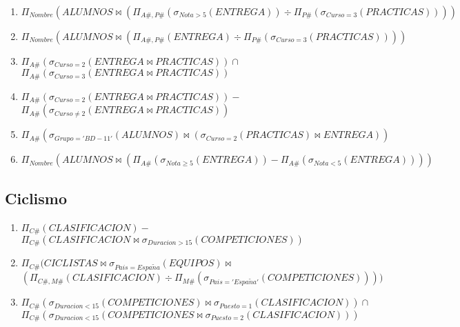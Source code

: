 \documentclass{db-practice}
\begin{document}
\begin{enumerate}
    \item $\Pi_{Nombre} \left( ALUMNOS \bowtie \left( \Pi_{A\#,P\#} \left( \sigma_{Nota>5} \left( ENTREGA \right) \right) \div \Pi_{P\#} \left( \sigma_{Curso=3} \left( PRACTICAS \right) \right) \right) \right)$
    \item $\Pi_{Nombre} \left( ALUMNOS \bowtie \left( \Pi_{A\#,P\#} \left( ENTREGA \right) \div \Pi_{P\#} \left( \sigma_{Curso=3} \left( PRACTICAS \right) \right)\right) \right)$
    \item $\Pi_{A\#} \left( \sigma_{Curso=2} \left( ENTREGA \bowtie PRACTICAS \right) \right) \cap$ \\
          $ \Pi_{A\#} \left( \sigma_{Curso=3} \left( ENTREGA \bowtie PRACTICAS \right) \right)$
    \item $\Pi_{A\#} \left( \sigma_{Curso=2} \left( ENTREGA \bowtie PRACTICAS \right) \right) -$ \\
          $\Pi_{A\#} \left( \sigma_{Curso \neq 2} \left( ENTREGA \bowtie PRACTICAS \right) \right)$
    \item $\Pi_{A\#} \left( \sigma_{Grupo='BD-11'} \left( ALUMNOS \right) \bowtie \left( \sigma_{Curso=2} \left( PRACTICAS \right) \bowtie ENTREGA \right) \right)$
    \item $\Pi_{Nombre} \left( ALUMNOS \bowtie \left( \Pi_{A\#} \left( \sigma_{Nota \geq 5} \left( ENTREGA \right) \right) - \Pi_{A\#} \left( \sigma_{Nota<5} \left( ENTREGA \right) \right) \right) \right)$
\end{enumerate}

\subsection{Ciclismo}

\begin{enumerate}
    \item $\Pi_{C\#} \left( CLASIFICACION \right) -$ \\
          $\Pi_{C\#} \left( CLASIFICACION \bowtie \sigma_{Duracion>15} \left( COMPETICIONES \right) \right)$
    \item $\Pi_{C\#} (CICLISTAS \bowtie \sigma_{Pais=Espa\tilde{n}a} (EQUIPOS) \bowtie$ \\
          $(\Pi_{C\#,M\#} (CLASIFICACION) \div \Pi_{M\#} (\sigma_{Pais='Espa\tilde{n}a'} (COMPETICIONES))))$
    \item $\Pi_{C\#} (\sigma_{Duracion<15} (COMPETICIONES) \bowtie \sigma_{Puesto=1} (CLASIFICACION)) \cap$ \\
          $\Pi_{C\#} (\sigma_{Duracion<15} (COMPETICIONES \bowtie \sigma_{Puesto=2} (CLASIFICACION)))$
\end{enumerate}
\end{document}
